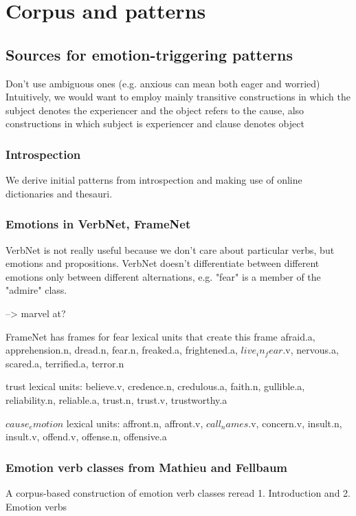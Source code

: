 
\chapter{Corpus and patterns} %

\label{ch:patterns} %


\section{Sources for emotion-triggering patterns}

Don't use ambiguous ones (e.g. anxious can mean both eager and worried)
Intuitively, we would want to employ mainly transitive constructions in which the subject denotes the experiencer and the object refers to the cause, also constructions in which subject is experiencer and clause denotes object


\subsection{Introspection}

We derive initial patterns from introspection and making use of online dictionaries and thesauri.

\subsection{Emotions in VerbNet, FrameNet}
VerbNet is not really useful because we don't care about particular verbs, but emotions and propositions. VerbNet doesn't differentiate between different emotions only between different alternations, e.g. "fear" is a member of the "admire" class.

--> marvel at?

FrameNet has frames for
fear
lexical units that create this frame
afraid.a, apprehension.n, dread.n, fear.n, freaked.a, frightened.a, $live_in_fear$.v, nervous.a, scared.a, terrified.a, terror.n

trust
lexical units: believe.v, credence.n, credulous.a, faith.n, gullible.a, reliability.n, reliable.a, trust.n, trust.v, trustworthy.a

$cause_emotion$
lexical units: affront.n, affront.v, $call_names$.v, concern.v, insult.n, insult.v, offend.v, offense.n, offensive.a



\subsection{Emotion verb classes from Mathieu and Fellbaum}
A corpus-based construction of emotion verb classes
reread 1. Introduction and 2. Emotion verbs

